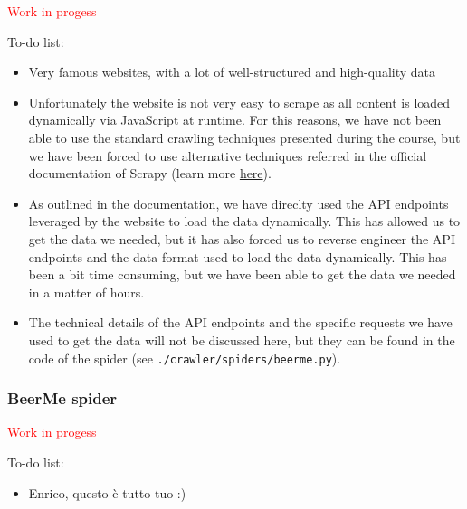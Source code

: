 \textcolor{red}{Work in progess}

To-do list:

\begin{itemize}
  \item Very famous websites, with a lot of well-structured and high-quality data
  \item Unfortunately the website is not very easy to scrape as all content is loaded dynamically via JavaScript at runtime. For this reasons, we have not been able to use the standard crawling techniques presented during the course, but we have been forced to use alternative techniques referred in the official documentation of Scrapy (learn more \href{https://docs.scrapy.org/en/latest/topics/dynamic-content.html}{here}).
  \item As outlined in the documentation, we have direclty used the API endpoints leveraged by the website to load the data dynamically. This has allowed us to get the data we needed, but it has also forced us to reverse engineer the API endpoints and the data format used to load the data dynamically. This has been a bit time consuming, but we have been able to get the data we needed in a matter of hours.
  \item The technical details of the API endpoints and the specific requests we have used to get the data will not be discussed here, but they can be found in the code of the spider (see \texttt{./crawler/spiders/beerme.py}).
\end{itemize}

\subsubsection{BeerMe spider}

\textcolor{red}{Work in progess}

To-do list:

\begin{itemize}
  \item Enrico, questo è tutto tuo :)
\end{itemize}
